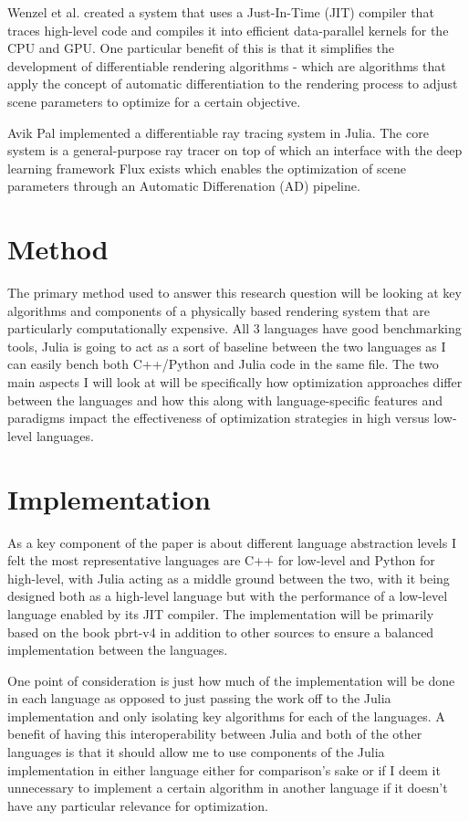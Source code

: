 \documentclass[11pt,a4paper,oneside]{article}
\begin{document}
\smallskip 
Wenzel et al. \cite{Jakob2020DrJit} created a system that uses a Just-In-Time (JIT) compiler that traces high-level code and compiles it into efficient data-parallel kernels for the CPU and GPU. One particular benefit of this is that it simplifies the development of differentiable rendering algorithms - which are algorithms that apply the concept of automatic differentiation to the rendering process to adjust scene parameters to optimize for a certain objective. 

\smallskip 
Avik Pal \cite{Pal2020} implemented a differentiable ray tracing system in Julia. The core system is a general-purpose ray tracer on top of which an interface with the deep learning framework Flux exists which enables the optimization of scene parameters through an Automatic Differenation (AD) pipeline.

\section{Method}

The primary method used to answer this research question will be looking at key algorithms and components of a physically based rendering system that are particularly computationally expensive. All 3 languages have good benchmarking tools, Julia is going to act as a sort of baseline between the two languages as I can easily bench both C++/Python and Julia code in the same file. The two main aspects I will look at will be specifically how optimization approaches differ between the languages and how this along with language-specific features and paradigms impact the effectiveness of optimization strategies in high versus low-level languages.

\section{Implementation}

As a key component of the paper is about different language abstraction levels I felt the most representative languages are C++ for low-level and Python for high-level, with Julia acting as a middle ground between the two, with it being designed both as a high-level language but with the performance of a low-level language enabled by its JIT compiler. The implementation will be primarily based on the book pbrt-v4 in addition to other sources to ensure a balanced implementation between the languages. 

\smallskip 
One point of consideration is just how much of the implementation will be done in each language as opposed to just passing the work off to the Julia implementation and only isolating key algorithms for each of the languages. A benefit of having this interoperability between Julia and both of the other languages is that it should allow me to use components of the Julia implementation in either language either for comparison's sake or if I deem it unnecessary to implement a certain algorithm in another language if it doesn't have any particular relevance for optimization. 
\end{document}
